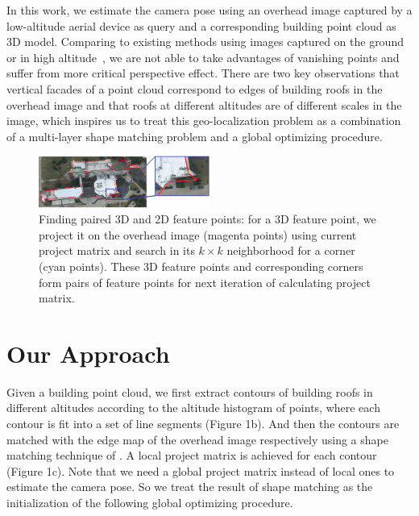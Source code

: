 \documentclass[sigconf,authorversion]{acmart}
\begin{document}
In this work, we estimate the camera pose using an overhead image captured by a low-altitude aerial device as query and a corresponding building point cloud as 3D model. Comparing to existing methods using images captured on the ground~\cite{instant} or in high altitude~\cite{FDCM}, we are not able to take advantages of vanishing points and suffer from more critical perspective effect. There are two key observations that vertical facades of a point cloud correspond to edges of building roofs in the overhead image and that roofs at different altitudes are of different scales in the image, which inspires us to treat this geo-localization problem as a combination of a multi-layer shape matching problem and a global optimizing procedure. 
%
\begin{figure}
	\centering
	\vspace{2.0cm}
	\includegraphics[width=0.5\textwidth]{figures/details_png}
	\caption{Finding paired 3D and 2D feature points: for a 3D feature point, we project it on the overhead image (magenta points) using current project matrix and search in its $k\times k$ neighborhood for a corner (cyan points). These 3D feature points and corresponding corners form pairs of feature points for next iteration of calculating project matrix.}
	\label{fig:overview}
\end{figure}
\section{Our Approach}
Given a building point cloud, we first extract contours of building roofs in different altitudes according to the altitude histogram of points, where each contour is fit into a set of line segments (Figure 1b). And then the contours are matched with the edge map of the overhead image respectively using a shape matching technique of \cite{FDCM}. A local project matrix is achieved for each contour (Figure 1c). Note that we need a global project matrix instead of local ones to estimate the camera pose. So we treat the result of shape matching as the initialization of the following global optimizing procedure. 
\end{document}
